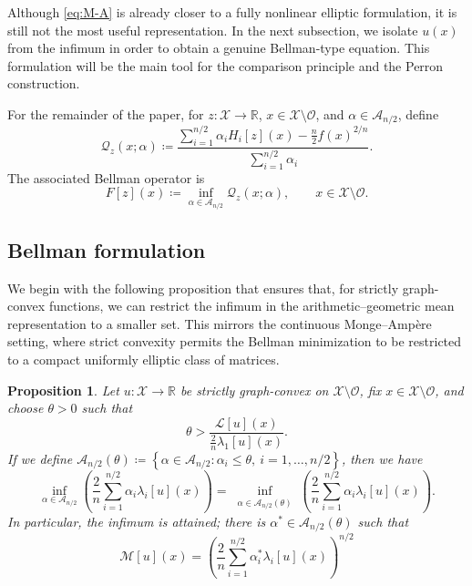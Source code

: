 \documentclass[reqno,11pt]{amsart}
\numberwithin{equation}{section}
\newtheorem{proposition}[theorem]{Proposition}
\theoremstyle{definition}
\theoremstyle{remark}
\begin{document}
Although \eqref{eq:M-A} is already closer to a fully nonlinear elliptic formulation, it is still not the most useful representation. In the next subsection, we isolate $u(x)$ from the infimum in order to obtain a genuine Bellman-type equation. This formulation will be the main tool for the comparison principle and the Perron construction. 

For the remainder of the paper, for \(z\colon\mathcal{X}\to\mathbb{R}\), \(x\in \mathcal{X} \setminus \mathcal{O}\), and \(\alpha\in\mathcal{A}_{n/2}\), define
\begin{equation}\label{eq:definition-Qf}
    \mathcal{Q}_z(x;\alpha)
    \coloneqq
    \frac{
        \displaystyle\sum_{i=1}^{n/2}\alpha_i H_i[z](x)
        -\frac n2 f(x)^{2/n}
    }{
        \displaystyle\sum_{i=1}^{n/2}\alpha_i
    }.
\end{equation}
The associated Bellman operator is
\begin{equation}\label{eq:definition-Ff}
    F[z](x)
    \coloneqq
    \inf_{\alpha\in\mathcal{A}_{n/2}}
    \mathcal{Q}_z(x;\alpha),
    \qquad x\in\mathcal{X} \setminus \mathcal{O}.
\end{equation}

\subsection{Bellman formulation}

We begin with the following proposition that ensures that, for strictly graph-convex functions, we can restrict the infimum in the arithmetic–geometric mean representation to a smaller set. This mirrors the continuous Monge--Amp\`ere setting, where strict convexity permits the Bellman minimization to be restricted to a compact uniformly elliptic class of matrices.

\begin{proposition}\label{lemma:restrict-set-alpha}
Let \(u\colon\mathcal X\to\mathbb R\) be strictly graph-convex on
\(\mathcal X\setminus\mathcal O\), fix
\(x\in\mathcal X\setminus\mathcal O\), and choose \(\theta>0\) such that
\[
    \theta > \frac{\mathcal{L}[u](x)}{\frac{2}{n}\lambda_1[u](x)}.
\]
If we define $\mathcal{A}_{n/2}(\theta) \coloneqq \left\{\alpha \in \mathcal{A}_{n/2}\colon \alpha_i \leq \theta, \ i=1,\ldots,n/2\right\}$, then we have  
\[
    \inf_{\alpha\in\mathcal{A}_{n/2}}\left(\frac{2}{n}\sum_{i=1}^{n/2}\alpha_i \lambda_i[u](x) \right) = \inf_{\substack{\alpha\in\mathcal{A}_{n/2}(\theta)}}\left(\frac{2}{n}\sum_{i=1}^{n/2}\alpha_i \lambda_i[u](x)\right).
\]
In particular, the infimum is attained; there is $\alpha^* \in \mathcal{A}_{n/2}(\theta)$ such that 
\[
    \mathcal{M}[u](x) = \left(\frac{2}{n}\sum_{i=1}^{n/2}\alpha^*_i \lambda_i[u](x) \right)^{n/2}
\]
\end{proposition}
\end{document}
